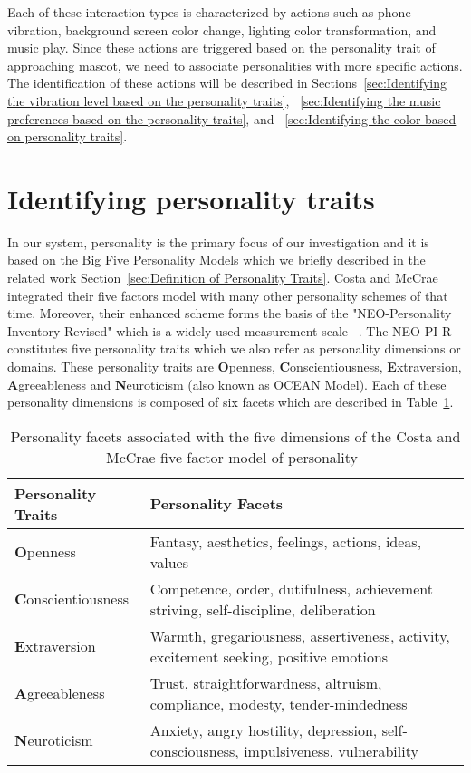 Each of these interaction types is characterized by actions such as phone vibration,
background screen color change, lighting color transformation, and music play.
Since these actions are triggered based on the personality trait of approaching mascot,
we need to associate personalities with more specific actions.
The identification of these actions will be described in
Sections~\ref{sec:Identifying the vibration level based on the personality traits},
~\ref{sec:Identifying the music preferences based on the personality traits},
and ~\ref{sec:Identifying the color based on personality traits}.

\section{Identifying personality traits}
\label{sec:Identifying personality traits}

In our system, personality is the primary focus of our investigation and
it is based on the Big Five Personality Models which we briefly described
in the related work Section~\ref{sec:Definition of Personality Traits}.
Costa and McCrae integrated their five factors model with many other personality schemes of that time.
Moreover, their enhanced scheme forms the basis of the "NEO-Personality Inventory-Revised"
which is a widely used measurement scale ~\cite{costa2008revised}.
The NEO-PI-R constitutes five personality traits which we also refer as personality dimensions or domains.
These personality traits are \textbf{O}penness, \textbf{C}onscientiousness,
\textbf{E}xtraversion, \textbf{A}greeableness and \textbf{N}euroticism (also known as  OCEAN Model).
Each of these personality dimensions is composed of six facets which are described in Table~\ref{table:personality}.

\begin{table} [h]
\centering
\begin{tabular}{ | m{8em} | m{25em}| }
\hline
\textbf{Personality Traits} & \textbf{Personality Facets}  \\
\hline
\textbf{O}penness & Fantasy, aesthetics, feelings, actions, ideas, values  \\
\hline 
\textbf{C}onscientiousness & Competence, order, dutifulness, achievement striving, self-discipline, deliberation  \\
\hline 
\textbf{E}xtraversion & Warmth, gregariousness, assertiveness, activity, excitement seeking, positive emotions \\
\hline 
\textbf{A}greeableness & Trust, straightforwardness, altruism, compliance, modesty, tender-mindedness  \\
\hline 
\textbf{N}euroticism & Anxiety, angry hostility, depression, self-consciousness, impulsiveness, vulnerability \\
\hline
\end{tabular}
\caption{Personality facets associated with the five dimensions of the Costa and McCrae five factor model of personality~\cite{costa2008revised, matthews2003personality}}
\label{table:personality}
\end{table}

